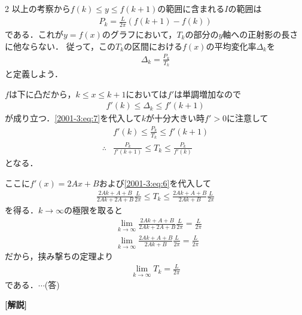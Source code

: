 \documentclass[../../../../main.tex]{subfiles}
\begin{document}
\begin{multicols}{2}
  以上の考察から$f(k) \le y \le f(k+1)$の範囲に含まれる$I$の範囲は
  \begin{align}
    P_{k} = \frac{L}{2\pi}\left(f(k+1)-f(k)\right) \label{2001-3:eq:6}
  \end{align}
  である．これが$y=f(x)$のグラフにおいて，$T_k$の部分の$y$軸への正射影の長さに他ならない．
  従って，この$T_k$の区間における$f(x)$の平均変化率$\Delta_{k}$を
  \begin{align}
    \Delta_{k} = \frac{P_{k}}{T_{k}} \label{2001-3:eq:7}
  \end{align}
  と定義しよう．

  $f$は下に凸だから，$k \le x \le k+1$においては$f'$は単調増加なので
  \begin{align}
    f'(k) \le \Delta_{k} \le f'(k+1) \label{2001-3:eq:8}
  \end{align}
  が成り立つ．\cref{2001-3:eq:7}を代入して$k$が十分大きい時$f'>0$に注意して
  \begin{align*}
     & f'(k) \le \frac{P_{k}}{T_{k}}  \le f'(k+1)        \\
    \therefore
     & \frac{P_k}{f'(k+1)} \le T_k \le \frac{P_k}{f'(k)}
  \end{align*}
  となる．

  ここに$f'(x) = 2Ax+B$および\cref{2001-3:eq:6}を代入して
  \begin{align*}
    \frac{2Ak+A+B}{2Ak+2A+B} \frac{L}{2\pi} \le T_k \le \frac{2Ak+A+B}{2Ak+B} \frac{L}{2\pi}
  \end{align*}
  を得る．$k\to\infty$の極限を取ると
  \begin{align*}
     & \lim_{k\to\infty} \frac{2Ak+A+B}{2Ak+2A+B} \frac{L}{2\pi} = \frac{L}{2\pi} \\
     & \lim_{k\to\infty}  \frac{2Ak+A+B}{2Ak+B} \frac{L}{2\pi}   = \frac{L}{2\pi}
  \end{align*}
  だから，挟み撃ちの定理より
  \begin{align*}
    \lim_{k\to\infty} T_{k} = \frac{L}{2\pi}
  \end{align*}
  である．$\cdots$(答)



  \vspace{10pt}
  {\bf[解説]}



  \newpage
\end{multicols}
\end{document}
